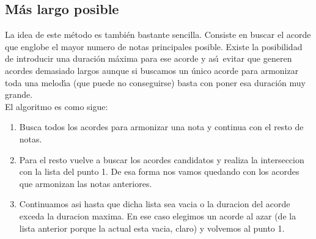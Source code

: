 \subsection{M\'as largo posible}
La idea de este m\'etodo es tambi\'en bastante sencilla. Consiste en 
buscar el acorde que englobe el mayor numero de notas principales
posible. Existe la posibilidad de introducir una duraci\'on m\'axima
para ese acorde y as\'\i ~evitar que generen acordes demasiado
largos aunque si buscamos un \'unico acorde para armonizar
toda una melod\'\i a (que puede no conseguirse) basta con poner esa
duraci\'on muy grande.\\
El algoritmo es como sigue:
\begin{enumerate}
\item Busca todos los acordes para armonizar una nota y continua
con el resto de notas.
\item Para el resto vuelve a buscar los acordes candidatos y 
realiza la interseccion con la lista del punto 1. De esa
forma nos vamos quedando con los acordes que armonizan las
notas anteriores.
\item Continuamos asi hasta que dicha lista sea vacia o la duracion
del acorde exceda la duracion maxima. En ese caso elegimos un 
acorde al azar (de la lista anterior porque la actual esta vacia, claro)
y volvemos al punto 1.
\end{enumerate}


